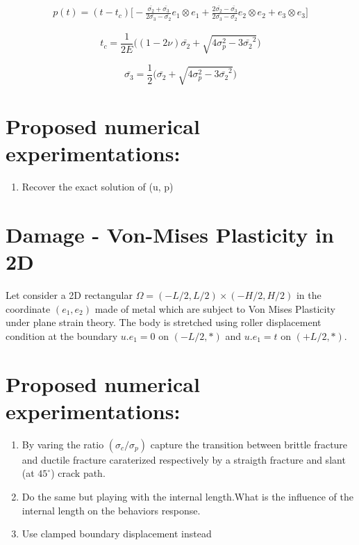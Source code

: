 \documentclass[10pt,oneside]{memoir}
\begin{document}
\begin{equation}
\begin{split}
\label{eq:UsolVonMises3D}
p(t)= (t-t_c) \Big[ -\frac{\bar{\sigma_2}+\bar{\sigma_3}}{2\bar{\sigma_3}-\bar{\sigma_2}} e_1 \otimes e_1 + \frac{2\bar{\sigma_2}-\bar{\sigma_3}}{2\bar{\sigma_3}-\bar{\sigma_2}} e_2\otimes e_2 + e_3\otimes e_3 \Big]
\end{split}
\end{equation}


$$t_c = \frac{1}{2E} \Big( (1-2\nu)\bar{\sigma_2} + \sqrt{4\sigma_p^2- 3\bar{\sigma_2}^2} \Big) $$


$$ \bar{\sigma_3}= \frac{1}{2} \Big( \bar{\sigma_2} + \sqrt{4\sigma_p^2-3\bar{\sigma_2}^2} \Big) $$

\section*{Proposed numerical experimentations:}
\begin{enumerate}
\item Recover the exact solution of (u, p)
\end{enumerate}


\section{Damage - Von-Mises Plasticity in 2D}
Let consider a 2D rectangular $\Omega= (-L/2,L/2) \times (-H/2,H/2)$ in the coordinate $(e_1, e_2)$ made of metal which are subject to Von Mises Plasticity under plane strain theory. The body is stretched using roller displacement condition at the boundary $u.e_1 = 0$ on $(-L/2,*)$ and $u.e_1 = t$ on $(+L/2,*)$.

\section*{Proposed numerical experimentations:}

\begin{enumerate}
\item By varing the ratio $(\sigma_c/\sigma_p)$ capture the transition between brittle fracture and ductile fracture caraterized respectively by a straigth fracture and slant (at $45^\circ$) crack path.
\item Do the same but playing with the internal length.What is the influence of the internal length on the behaviors response.
\item Use clamped boundary displacement instead
\end{enumerate}
\end{document}
